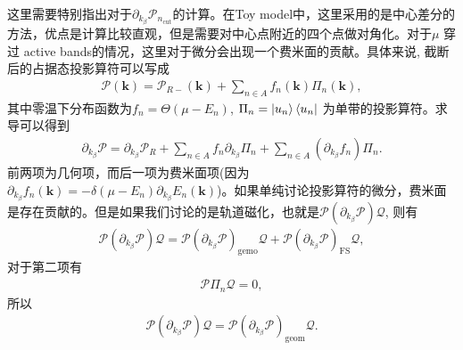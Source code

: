 \documentclass[10pt, oneside]{article}
\begin{document}
这里需要特别指出对于\(\partial_{k_{\beta}} \mathcal{P}_{n_{\mathrm{cut}}}\)的计算。在Toy model中，这里采用的是中心差分的方法，优点是计算比较直观，但是需要对中心点附近的四个点做对角化。对于\(\mu\) 穿过 active bands的情况，这里对于微分会出现一个费米面的贡献。具体来说, 截断后的占据态投影算符可以写成
\begin{align}
	\mathcal{P} \left(\bm{k}\right) = \mathcal{P}_{R-} \left(\bm{k}\right) + \sum_{n \in A} f_{n } \left(\bm{k} \right) \Pi_{n } \left(\bm{k}\right),
\end{align}
其中零温下分布函数为\(f_{n} = \Theta \left(\mu - E_{n}\right)\), \(\Pi_{n} = \ket{u_n} \bra{u_{n }}\) 为单带的投影算符。求导可以得到
\begin{align}
	\partial_{k_{\beta}} \mathcal{P} = \partial_{k_{\beta}} \mathcal{P}_{R } + \sum_{n \in A } f_{n } \partial_{k_{\beta}} \Pi_{n } + \sum_{n \in A } \left(\partial_{k_{\beta}} f_{n }\right) \Pi_{n }.
\end{align}
前两项为几何项，而后一项为费米面项(因为\(\partial_{k_{\beta}} f_{n} \left(\bm{k}\right) = - \delta \left( \mu - E_{n }\right) \partial_{k_{\beta}} E_{n } \left(\bm{k}\right)\))。如果单纯讨论投影算符的微分，费米面是存在贡献的。但是如果我们讨论的是轨道磁化，也就是\(\mathcal{P} \left(\partial_{k_{\beta}} \mathcal{P}\right)\mathcal{Q}\), 则有
\begin{align}
	\mathcal{P} \left(\partial_{k_{\beta}} \mathcal{P}\right)\mathcal{Q} = \mathcal{P} \left(\partial_{k_{\beta}} \mathcal{P}\right)_{\mathrm{gemo}}  \mathcal{Q} + \mathcal{P} \left(\partial_{k_{\beta}} \mathcal{P}\right)_{\mathrm{FS}}  \mathcal{Q},
\end{align}
对于第二项有
\begin{align}
	\mathcal{P} \Pi_{n } \mathcal{Q} = 0,
\end{align}
所以
\begin{align}
	\mathcal{P} \left(\partial_{k_{\beta}} \mathcal{P}\right)\mathcal{Q} = \mathcal{P} \left(\partial_{k_{\beta}} \mathcal{P}\right)_{\mathrm{geom}}  \mathcal{Q}.
\end{align}
\end{document}
